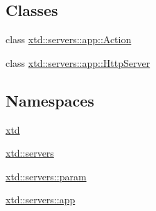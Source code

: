 \subsection*{Classes}
\begin{DoxyCompactItemize}
\item 
class \hyperlink{classxtd_1_1servers_1_1app_1_1Action}{xtd\+::servers\+::app\+::\+Action}
\item 
class \hyperlink{classxtd_1_1servers_1_1app_1_1HttpServer}{xtd\+::servers\+::app\+::\+Http\+Server}
\end{DoxyCompactItemize}
\subsection*{Namespaces}
\begin{DoxyCompactItemize}
\item 
 \hyperlink{namespacextd}{xtd}
\item 
 \hyperlink{namespacextd_1_1servers}{xtd\+::servers}
\item 
 \hyperlink{namespacextd_1_1servers_1_1param}{xtd\+::servers\+::param}
\item 
 \hyperlink{namespacextd_1_1servers_1_1app}{xtd\+::servers\+::app}
\end{DoxyCompactItemize}
